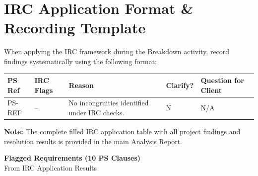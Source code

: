 \documentclass[11pt,a4paper]{article}
\begin{document}
\vspace{6pt}

\section*{IRC Application Format \& Recording Template}
\vspace{-2pt}

When applying the IRC framework during the Breakdown activity, record findings systematically using the following format:

\vspace{6pt}

\begin{table}[H]
\centering
\renewcommand{\arraystretch}{1.2}
\begin{tabular}{|>{\raggedright\arraybackslash}p{}|
                >{\raggedright\arraybackslash}p{}|
                >{\raggedright\arraybackslash}p{}|
                >{\centering\arraybackslash}p{}|
                >{\raggedright\arraybackslash}p{}|}
\hline
\rowcolor{tableheader}
\textbf{PS Ref} & \textbf{IRC Flags} & \textbf{Reason} & \textbf{Clarify?} & \textbf{Question for Client} \\
\hline
PS-REF & -- & No incongruities identified under IRC checks. & N & N/A \\
\hline
\end{tabular}
\end{table}

\textbf{Note:} The complete filled IRC application table with all project findings and resolution results is provided in the main Analysis Report.

\newpage


\begin{center}
{\Large \textbf{Flagged Requirements (10 PS Clauses)}}\\[4pt]
{\normalsize From IRC Application Results}
\end{center}

\vspace{8pt}
\end{document}
